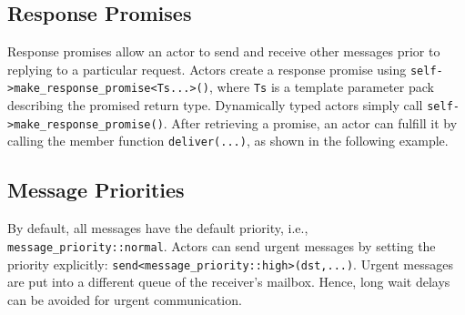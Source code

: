 \subsection{Response Promises}
\label{promise}

Response promises allow an actor to send and receive other messages prior to
replying to a particular request. Actors create a response promise using
\lstinline^self->make_response_promise<Ts...>()^, where \lstinline^Ts^ is a
template parameter pack describing the promised return type. Dynamically typed
actors simply call \lstinline^self->make_response_promise()^. After retrieving
a promise, an actor can fulfill it by calling the member function
\lstinline^deliver(...)^, as shown in the following example.


\clearpage
\subsection{Message Priorities}

By default, all messages have the default priority, i.e.,
\lstinline^message_priority::normal^. Actors can send urgent messages by
setting the priority explicitly:
\lstinline^send<message_priority::high>(dst,...)^. Urgent messages are put into
a different queue of the receiver's mailbox. Hence, long wait delays can be
avoided for urgent communication.
